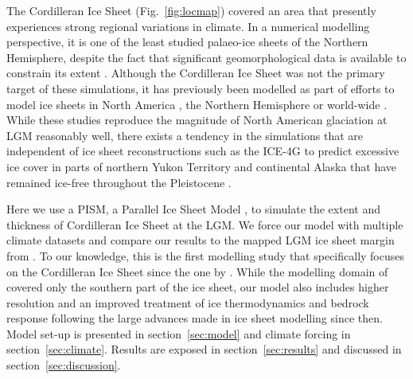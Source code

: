 The Cordilleran Ice Sheet (Fig.~\ref{fig:locmap}) covered an area that presently experiences strong regional variations in climate. In a numerical modelling perspective, it is one of the least studied palaeo-ice sheets of the Northern Hemisphere, despite the fact that significant geomorphological data is available to constrain its extent \citep{jackson-clague-1991,dukrodkin-1999,kaufman-manley-2004,kleman-etal-2010,margold-etal-2011}. Although the Cordilleran Ice Sheet was not the primary target of these simulations, it has previously been modelled as part of efforts to model ice sheets in North America \citep{marshall-clarke-1999,calov-etal-2002,tarasov-peltier-1997,tarasov-peltier-2004,gregoire-etal-2012}, the Northern Hemisphere \citep{huybrechts-tsiobbel-1996,greve-etal-1999,charbit-etal-2002,charbit-etal-2007,charbit-etal-2013,johnson-fastook-2002,rodgers-etal-2004,bintanja-etal-2005,zweck-huybrechts-2005,abeouchi-etal-2007} or world-wide \citep{yoshimori-etal-2001}. While these studies reproduce the magnitude of North American glaciation at LGM reasonably well, there exists a tendency in the simulations that are independent of ice sheet reconstructions such as the ICE-4G to predict excessive ice cover in parts of northern Yukon Territory and continental Alaska that have remained ice-free throughout the Pleistocene \citep{dukrodkin-1999,kaufman-manley-2004}.

Here we use a PISM, a Parallel Ice Sheet Model \citep{web:pism}, to simulate the extent and thickness of Cordilleran Ice Sheet at the LGM. We force our model with multiple climate datasets and compare our results to the mapped LGM ice sheet margin from \citet{dyke-2004}. To our knowledge, this is the first modelling study that specifically focuses on the Cordilleran Ice Sheet since the one by \citet{robert-1991}. While the modelling domain of \citet{robert-1991} covered only the southern part of the ice sheet, our model also includes higher resolution and an improved treatment of ice thermodynamics and bedrock response following the large advances made in ice sheet modelling since then. Model set-up is presented in section~\ref{sec:model} and climate forcing in section~\ref{sec:climate}. Results are exposed in section~\ref{sec:results} and discussed in section~\ref{sec:discussion}.
